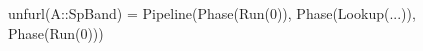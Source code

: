 \begin{juliacode} 
unfurl(A::SpBand) = 
Pipeline(Phase(Run(0)), Phase(Lookup(...)), Phase(Run(0)))
\end{juliacode}
